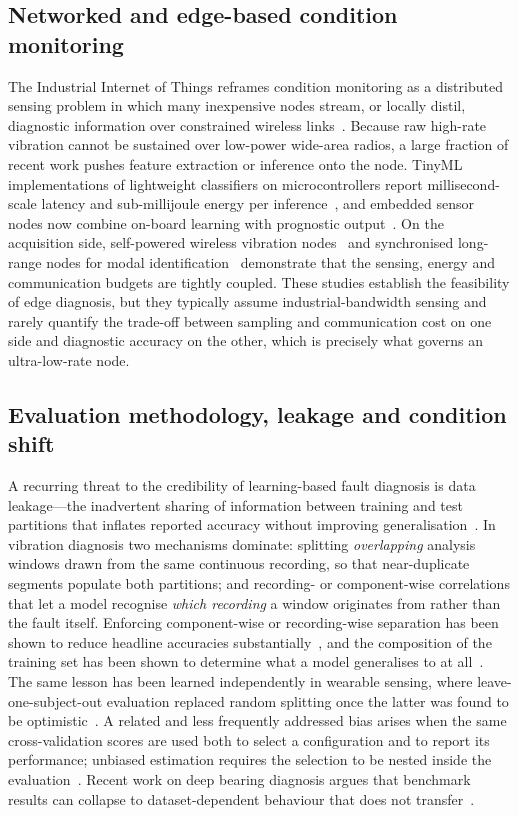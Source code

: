 \subsection{Networked and edge-based condition monitoring}
The Industrial Internet of Things reframes condition monitoring as a distributed
sensing problem in which many inexpensive nodes stream, or locally distil,
diagnostic information over constrained wireless links~\cite{yousuf2024iot,
halenar2024iot}. Because raw high-rate vibration cannot be sustained over
low-power wide-area radios, a large fraction of recent work pushes feature
extraction or inference onto the node. TinyML implementations of lightweight
classifiers on microcontrollers report millisecond-scale latency and
sub-millijoule energy per inference~\cite{gao2025edge, asutkar2023tinyml,
zaidi2022tinyml}, and embedded sensor nodes now combine on-board learning with
prognostic output~\cite{chaoraingern2025tinyml}. On the acquisition side,
self-powered wireless vibration nodes~\cite{rubes2021wireless} and synchronised
long-range nodes for modal identification~\cite{qiao2024wireless} demonstrate that
the sensing, energy and communication budgets are tightly coupled. These studies
establish the feasibility of edge diagnosis, but they typically assume
industrial-bandwidth sensing and rarely quantify the trade-off between
sampling and communication cost on one side and diagnostic accuracy on the other,
which is precisely what governs an ultra-low-rate node.

\subsection{Evaluation methodology, leakage and condition shift}
\label{subsec:leakage}
A recurring threat to the credibility of learning-based fault diagnosis is data
leakage---the inadvertent sharing of information between training and test
partitions that inflates reported accuracy without improving
generalisation~\cite{kapoor2023leakage, lones2024leakage}. In vibration diagnosis
two mechanisms dominate: splitting \emph{overlapping} analysis windows drawn from
the same continuous recording, so that near-duplicate segments populate both
partitions; and recording- or component-wise correlations that let a model
recognise \emph{which recording} a window originates from rather than the fault
itself. Enforcing component-wise or recording-wise separation has been shown to
reduce headline accuracies substantially~\cite{wheat2024impact, hendriks2022towards},
and the composition of the training set has been shown to determine what a model
generalises to at all~\cite{ursu2025leakage}. The same lesson has been learned
independently in wearable sensing, where leave-one-subject-out evaluation replaced
random splitting once the latter was found to be optimistic~\cite{gholamiangonabadi2020cv}.
A related and less frequently addressed bias arises when the same
cross-validation scores are used both to select a configuration and to report its
performance; unbiased estimation requires the selection to be nested inside the
evaluation~\cite{qi2019cv}. Recent work on deep bearing diagnosis argues that
benchmark results can collapse to dataset-dependent behaviour that does not
transfer~\cite{wang2026benchmark}.

